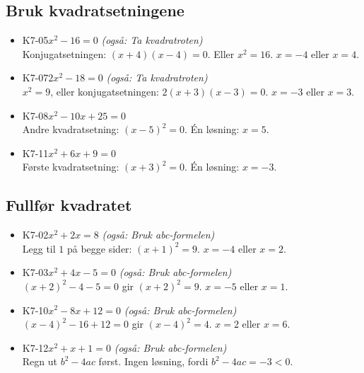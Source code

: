 \documentclass[11pt,a4paper]{article}
\begin{document}
\subsection*{Bruk kvadratsetningene}
\begin{itemize}[leftmargin=1.2em, itemsep=0.35em]
\item \textsf{\small K7-05}\quad $x^2 - 16 = 0$ \emph{(også: Ta kvadratroten)}\\{\small\color{dempet}Konjugatsetningen: $(x + 4)(x - 4) = 0$. Eller $x^2 = 16$. $x = -4$ eller $x = 4$.}
\item \textsf{\small K7-07}\quad $2x^2 - 18 = 0$ \emph{(også: Ta kvadratroten)}\\{\small\color{dempet}$x^2 = 9$, eller konjugatsetningen: $2(x + 3)(x - 3) = 0$. $x = -3$ eller $x = 3$.}
\item \textsf{\small K7-08}\quad $x^2 - 10x + 25 = 0$\\{\small\color{dempet}Andre kvadratsetning: $(x - 5)^2 = 0$. Én løsning: $x = 5$.}
\item \textsf{\small K7-11}\quad $x^2 + 6x + 9 = 0$\\{\small\color{dempet}Første kvadratsetning: $(x + 3)^2 = 0$. Én løsning: $x = -3$.}
\end{itemize}
\subsection*{Fullfør kvadratet}
\begin{itemize}[leftmargin=1.2em, itemsep=0.35em]
\item \textsf{\small K7-02}\quad $x^2 + 2x = 8$ \emph{(også: Bruk abc-formelen)}\\{\small\color{dempet}Legg til $1$ på begge sider: $(x + 1)^2 = 9$. $x = -4$ eller $x = 2$.}
\item \textsf{\small K7-03}\quad $x^2 + 4x - 5 = 0$ \emph{(også: Bruk abc-formelen)}\\{\small\color{dempet}$(x + 2)^2 - 4 - 5 = 0$ gir $(x + 2)^2 = 9$. $x = -5$ eller $x = 1$.}
\item \textsf{\small K7-10}\quad $x^2 - 8x + 12 = 0$ \emph{(også: Bruk abc-formelen)}\\{\small\color{dempet}$(x - 4)^2 - 16 + 12 = 0$ gir $(x - 4)^2 = 4$. $x = 2$ eller $x = 6$.}
\item \textsf{\small K7-12}\quad $x^2 + x + 1 = 0$ \emph{(også: Bruk abc-formelen)}\\{\small\color{dempet}Regn ut $b^2 - 4ac$ først. Ingen løsning, fordi $b^2 - 4ac = -3 < 0$.}
\end{itemize}
\end{document}
